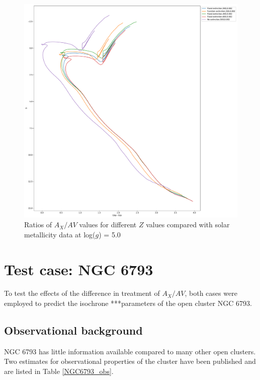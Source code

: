 \documentclass[12pt, a4paper]{report}
\begin{document}
\begin{figure}[h]
\begin{center}
\includegraphics[scale=0.3]{../basti_isochrones_10_13Gyr/Extinction_T50k_FeH0fix_func_G_GbpmGrp_500_400_600_Myr_FeH_0p002_ref_noext_Av_1p0.pdf}
\caption{Ratios of $A_{X}/A{V}$ values for different $Z$ values compared with solar metallicity data at log($g$) = 5.0}
\label{gaia_isoc_T50k}
\end{center}
\end{figure}

\section{Test case: NGC 6793}
To test the effects of the difference in treatment of $A_{X}/A{V}$, both cases were employed to predict the isochrone ***parameters of the open cluster NGC 6793.

\subsection{Observational background}
NGC 6793 has little information available compared to many other open clusters. Two estimates for observational properties of the cluster have been published and are listed in Table \ref{NGC6793_obs}.
\end{document}
